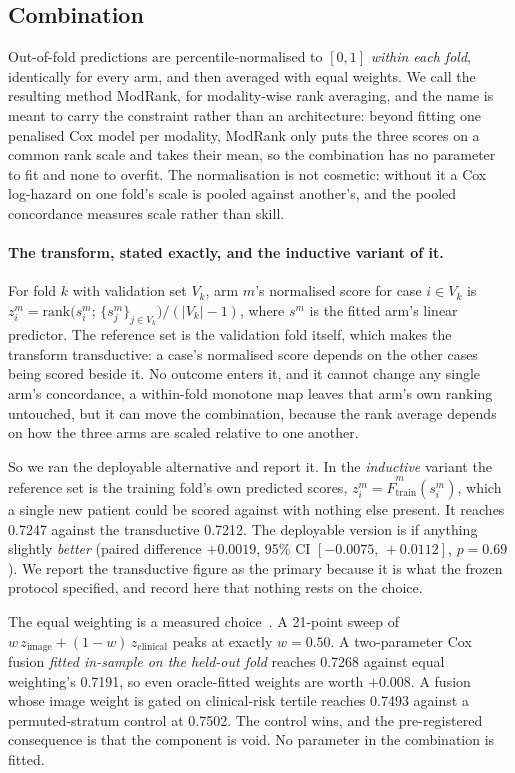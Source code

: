 \documentclass[unnumsec,webpdf,contemporary,large]{oup-authoring-template}
\begin{document}
\subsection{Combination}

Out-of-fold predictions are percentile-normalised to $[0,1]$ \emph{within each fold}, identically
for every arm, and then averaged with equal weights. We call the resulting method ModRank,
for modality-wise rank averaging, and the name is meant to carry the constraint rather than an
architecture: beyond fitting one penalised Cox model per modality, ModRank only puts the three scores on a common rank scale and takes their mean, so the combination has no
parameter to fit and none to overfit. The normalisation is not cosmetic: without it
a Cox log-hazard on one fold's scale is pooled against another's, and the pooled concordance
measures scale rather than skill.

\paragraph{The transform, stated exactly, and the inductive variant of it.} For fold $k$ with
validation set $V_k$, arm $m$'s normalised score for case $i \in V_k$ is
$z^{m}_{i} = \mathrm{rank}\big(s^{m}_{i};\, \{s^{m}_{j}\}_{j \in V_k}\big) / (|V_k| - 1)$, where
$s^{m}$ is the fitted arm's linear predictor. The reference set is the validation fold
itself, which makes the transform transductive: a case's normalised score depends on the other
cases being scored beside it. No outcome enters it, and it cannot change any single arm's
concordance, a within-fold monotone map leaves that arm's own ranking untouched, but it can
move the combination, because the rank average depends on how the three arms are scaled relative to
one another.

So we ran the deployable alternative and report it. In the \emph{inductive} variant the reference
set is the training fold's own predicted scores, $z^{m}_{i} = \hat{F}^{m}_{\text{train}}(s^{m}_{i})$,
which a single new patient could be scored against with nothing else present. It reaches
0.7247 against the transductive 0.7212. The deployable version is if anything slightly
\emph{better} (paired difference $+0.0019$, 95\% CI $[-0.0075,\,+0.0112]$, $p=0.69$). We report the
transductive figure as the primary because it is what the frozen protocol specified, and record
here that nothing rests on the choice.

The equal weighting is a measured choice~\citep{bates1969combination}. A 21-point sweep of
$w\,z_{\text{image}} + (1-w)\,z_{\text{clinical}}$ peaks at exactly $w=0.50$. A two-parameter Cox
fusion \emph{fitted in-sample on the held-out fold} reaches 0.7268 against equal weighting's 0.7191,
so even oracle-fitted weights are worth $+0.008$. A fusion whose image weight is gated on
clinical-risk tertile reaches 0.7493 against a permuted-stratum control at 0.7502. The control
wins, and the pre-registered consequence is that the component is void. No parameter in the
combination is fitted.
\end{document}
